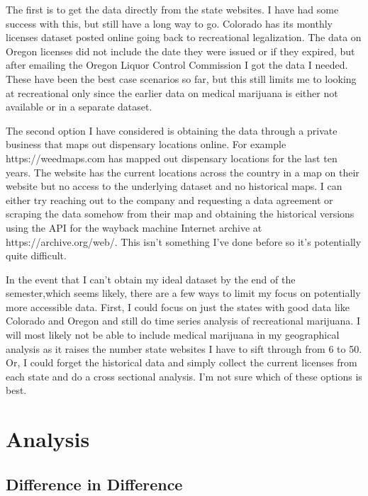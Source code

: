 \documentclass[11pt]{article}
\begin{document}
The first is to get the data directly from the state websites. I have had some success with this, but still have a long way to go. Colorado has its monthly licenses dataset posted online going back to recreational legalization. The data on Oregon licenses did not include the date they were issued or if they expired, but after emailing the Oregon Liquor Control Commission I got the data I needed. These have been the best case scenarios so far, but this still limits me to looking at recreational only since the earlier data on medical marijuana is either not available or in a separate dataset. \par

The second option I have considered is obtaining the data through a private business that maps out dispensary locations online. For example https://weedmaps.com has mapped out dispensary locations for the last ten years. The website has the current locations across the country in a map on their website but no access to the underlying dataset and no historical maps. I can either try reaching out to the company and requesting a data agreement or scraping the data somehow from their map and obtaining the historical versions using the API for the wayback machine Internet archive at https://archive.org/web/. This isn't something I've done before so it's potentially quite difficult. \par


In the event that I can't obtain my ideal dataset by the end of the semester,which seems likely, there are a few ways to limit my focus on potentially more accessible data. First, I could focus on just the states with good data like Colorado and Oregon and still do time series analysis of recreational marijuana. I will most likely not be able to include medical marijuana in my geographical analysis as it raises the number state websites I have to sift through from 6 to 50. Or, I could forget the historical data and simply collect the current licenses from each state and do a cross sectional analysis. I'm not sure which of these options is best. 


\section{Analysis}

\subsection{Difference in Difference}
\end{document}
